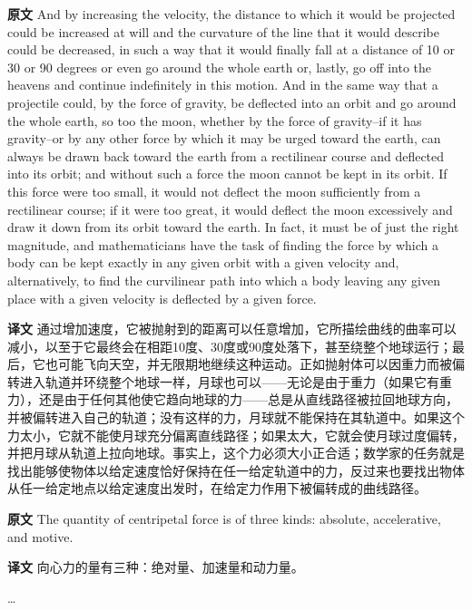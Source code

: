 \documentclass[UTF8,zihao=-4]{ctexart}
\begin{document}
\noindent\textbf{原文} And by increasing the velocity, the distance to which it would be projected could be increased at will and the curvature of the line that it would describe could be decreased, in such a way that it would finally fall at a distance of 10 or 30 or 90 degrees or even go around the whole earth or, lastly, go off into the heavens and continue indefinitely in this motion. And in the same way that a projectile could, by the force of gravity, be deflected into an orbit and go around the whole earth, so too the moon, whether by the force of gravity--if it has gravity--or by any other force by which it may be urged toward the earth, can always be drawn back toward the earth from a rectilinear course and deflected into its orbit; and without such a force the moon cannot be kept in its orbit. If this force were too small, it would not deflect the moon sufficiently from a rectilinear course; if it were too great, it would deflect the moon excessively and draw it down from its orbit toward the earth. In fact, it must be of just the right magnitude, and mathematicians have the task of finding the force by which a body can be kept exactly in any given orbit with a given velocity and, alternatively, to find the curvilinear path into which a body leaving any given place with a given velocity is deflected by a given force.
\par\noindent\textbf{译文} 通过增加速度，它被抛射到的距离可以任意增加，它所描绘曲线的曲率可以减小，以至于它最终会在相距10度、30度或90度处落下，甚至绕整个地球运行；最后，它也可能飞向天空，并无限期地继续这种运动。正如抛射体可以因重力而被偏转进入轨道并环绕整个地球一样，月球也可以——无论是由于重力（如果它有重力），还是由于任何其他使它趋向地球的力——总是从直线路径被拉回地球方向，并被偏转进入自己的轨道；没有这样的力，月球就不能保持在其轨道中。如果这个力太小，它就不能使月球充分偏离直线路径；如果太大，它就会使月球过度偏转，并把月球从轨道上拉向地球。事实上，这个力必须大小正合适；数学家的任务就是找出能够使物体以给定速度恰好保持在任一给定轨道中的力，反过来也要找出物体从任一给定地点以给定速度出发时，在给定力作用下被偏转成的曲线路径。
\medskip

\noindent\textbf{原文} The quantity of centripetal force is of three kinds: absolute, accelerative, and motive.
\par\noindent\textbf{译文} 向心力的量有三种：绝对量、加速量和动力量。
\medskip

\begin{center}
\ldots
\end{center}
\end{document}
